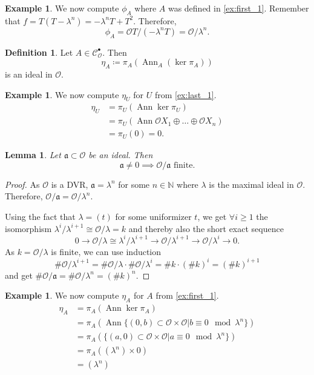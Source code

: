 \documentclass{article}
\theoremstyle{plain}%
\newtheorem{lemma}[theorem]{Lemma}
\theoremstyle{definition}
\newtheorem{definition}[theorem]{Definition}
\newtheorem{example}[theorem]{Example}
\theoremstyle{remark}
\newcommand{\cob}{\mathcal{C}_\mathcal{O}^\bullet}
\newcommand{\ann}{\operatorname{Ann}}
\begin{document}
\begin{example}\label{ex:first_phi}
    We now compute \(\phi_A\) where \(A\) was defined in \cref{ex:first_1}.
    Remember that \(f = T(T-\lambda^n) = -\lambda^n T + T^2\). Therefore,
    \[\phi_A = \mathcal{O}T/(-\lambda^n T) = \mathcal{O}/\lambda^n.\]
\end{example}

\begin{definition}
    Let \(A \in \cob\). Then
    \[\eta_A \coloneqq \pi_A(\ann_A (\ker \pi_A))\] is an ideal in \(\mathcal{O}\).
\end{definition}

\begin{example}
    We now compute \(\eta_U\) for \(U\) from \cref{ex:last_1}.
    \begin{align*}
        \eta_U &= \pi_U(\ann \ker \pi_U)\\
        &= \pi_U(\ann \mathcal{O}X_1 \oplus \dots \oplus \mathcal{O}X_n)\\
        &= \pi_U(0) = 0.
    \end{align*}
\end{example}

\begin{lemma}\label{lem:ideals}
    Let \(\mathfrak a \subset \mathcal{O}\) be an ideal. Then
    \[\mathfrak a \neq 0 \implies \mathcal{O}/\mathfrak a \text{ finite}.\]
\end{lemma}
\begin{proof}
    As \(\mathcal{O}\) is a DVR, \(\mathfrak a = \lambda^n\) for some \(n \in \mathbb N\) 
    where \(\lambda\) is the maximal ideal in \(\mathcal{O}\).
    Therefore, \(\mathcal{O}/\mathfrak{a} = \mathcal{O}/\lambda^n.\)

    Using the fact that \(\lambda = (t)\) for some uniformizer \(t\), we get \(\forall i \ge 1\) 
    the isomorphism \(\lambda^i/\lambda^{i+1} \cong \mathcal{O}/\lambda = k\) and thereby also the short exact sequence 
    \[0 \to \mathcal{O}/\lambda \cong \lambda^i/\lambda^{i+1} \to \mathcal{O}/\lambda^{i+1} \to \mathcal{O}/\lambda^{i} \to 0.\]
    As \(k = \mathcal{O}/\lambda\) is finite, we can use induction
    \[\# \mathcal{O}/\lambda^{i+1} = \# \mathcal{O}/\lambda \cdot \# \mathcal{O}/\lambda^i = \# k \cdot (\# k)^i = (\# k)^{i+1}\]
    and get \(\# \mathcal{O}/\mathfrak{a} = \# \mathcal{O}/\lambda^n = (\# k)^n\).
\end{proof}

\begin{example}\label{ex:first_eta}
    We now compute \(\eta_A\) for \(A\) from \cref{ex:first_1}.
    \begin{align*}
        \eta_A &= \pi_A(\ann \ker \pi_A)\\
        &= \pi_A(\ann \{(0, b) \subset \mathcal{O}\times \mathcal{O} | b \equiv 0 \mod \lambda^n\})\\
        &= \pi_A(\{(a, 0) \subset \mathcal{O}\times \mathcal{O} | a \equiv 0 \mod \lambda^n\})\\
        &= \pi_A((\lambda^n) \times 0)\\
        &= (\lambda^n)
    \end{align*}
\end{example}
\end{document}
